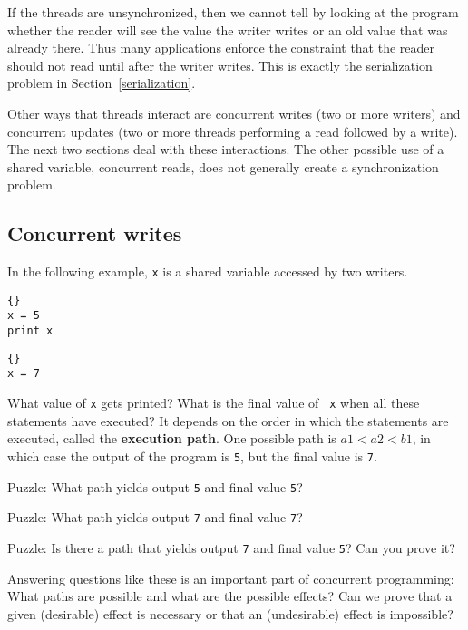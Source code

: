 \documentclass{book}
\begin{document}
If the threads are unsynchronized, then we cannot tell by looking at
the program whether the reader will see the value the writer writes
or an old value that was already there.
Thus many applications enforce the constraint that the reader
should not read until after the writer writes.  This is exactly
the serialization problem in Section~\ref{serialization}.

Other ways that threads interact are
concurrent writes (two or more writers) and concurrent updates
(two or more threads performing a read followed by a write).
The next two sections deal with these interactions.  The other
possible use of a shared variable, concurrent
reads, does not generally create a synchronization problem.


\subsection {Concurrent writes}

In the following example, {\tt x} is a shared variable accessed
by two writers.

\begin{minipage}[t]{2in}
\begin{lstlisting}[title={Thread A}]{}
x = 5
print x
\end{lstlisting}
\end{minipage}
\hfill
\begin{minipage}[t]{2in}
\begin{lstlisting}[title={Thread B}]{}
x = 7
\end{lstlisting}
\end{minipage}

What value of {\tt x} gets printed?  What is the final value of {\tt
x} when all these statements have executed?  It depends on the order
in which the statements are executed, called the {\bf execution path}.
One possible path is $a1 < a2 < b1$, in which case the output of the
program is {\tt 5}, but the final value is {\tt 7}.

Puzzle: What path yields output {\tt 5} and final
value {\tt 5}?

Puzzle: What path yields output {\tt 7} and final
value {\tt 7}?

Puzzle: Is there a path that yields output {\tt 7} and final
value {\tt 5}?  Can you prove it?

Answering questions like these is an important part of concurrent
programming:  What paths are possible and what are the
possible effects?  Can we prove that a given (desirable) effect is
necessary or that an (undesirable) effect is impossible?
\end{document}
